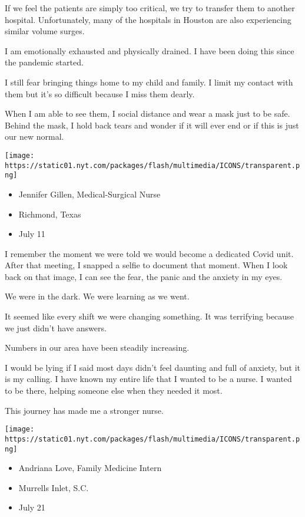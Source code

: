If we feel the patients are simply too critical, we try to transfer them
to another hospital. Unfortunately, many of the hospitals in Houston are
also experiencing similar volume surges.

I am emotionally exhausted and physically drained. I have been doing
this since the pandemic started.

I still fear bringing things home to my child and family. I limit my
contact with them but it's so difficult because I miss them dearly.

When I am able to see them, I social distance and wear a mask just to be
safe. Behind the mask, I hold back tears and wonder if it will ever end
or if this is just our new normal.

\texttt{[image: https://static01.nyt.com/packages/flash/multimedia/ICONS/transparent.png]}

\begin{itemize}
\tightlist
\item
  Jennifer Gillen, Medical-Surgical Nurse
\item
  Richmond, Texas
\item
  July 11
\end{itemize}

I remember the moment we were told we would become a dedicated Covid
unit. After that meeting, I snapped a selfie to document that moment.
When I look back on that image, I can see the fear, the panic and the
anxiety in my eyes.

We were in the dark. We were learning as we went.

It seemed like every shift we were changing something. It was terrifying
because we just didn't have answers.

Numbers in our area have been steadily increasing.

I would be lying if I said most days didn't feel daunting and full of
anxiety, but it is my calling. I have known my entire life that I wanted
to be a nurse. I wanted to be there, helping someone else when they
needed it most.

This journey has made me a stronger nurse.

\texttt{[image: https://static01.nyt.com/packages/flash/multimedia/ICONS/transparent.png]}

\begin{itemize}
\tightlist
\item
  Andriana Love, Family Medicine Intern
\item
  Murrells Inlet, S.C.
\item
  July 21
\end{itemize}

